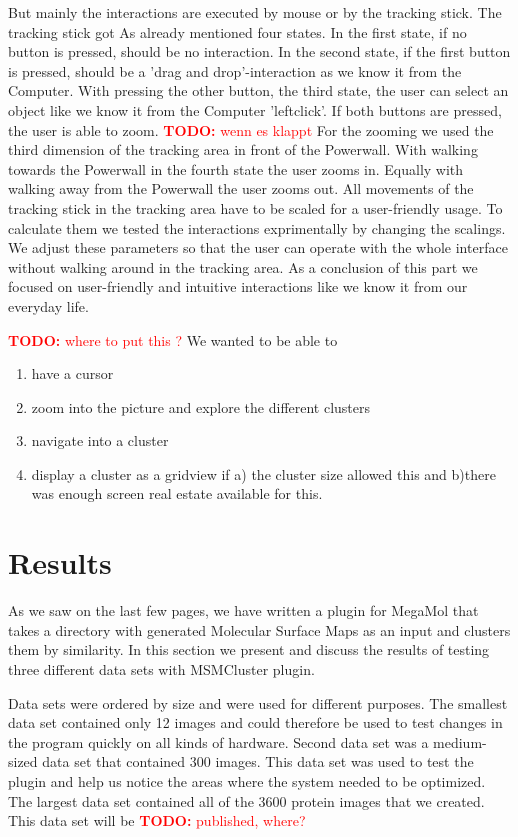 \documentclass[journal]{vgtc}       %
\newcommand{\todo}[1]{\textcolor{red}{\textbf{TODO:} #1}}
\begin{document}
But mainly the interactions are executed by mouse or by the tracking stick. The tracking stick got As already mentioned four states. In the first state, if no button is pressed, should be no interaction. In the second state, if the first button is pressed, should be a 'drag and drop'-interaction as we know it from the Computer. With pressing the other button, the third state, the user can select an object like we know it from the Computer 'leftclick'. If both buttons are pressed, the user is able to zoom. \todo{wenn es klappt} For the zooming we used the third dimension of the tracking area in front of the Powerwall. With walking towards the Powerwall in the fourth state the user zooms in. Equally with walking away from the Powerwall the user zooms out. 
All movements of the tracking stick in the tracking area have to be scaled for a user-friendly usage. To calculate them we tested the interactions exprimentally by changing the scalings. We adjust these parameters so that the user can operate with the whole interface without walking around in the tracking area.
As a conclusion of this part we focused on user-friendly and intuitive interactions like we know it from our everyday life.


\todo{where to put this ?}
We wanted to be able to 
\begin{enumerate}
  \item have a cursor 
  \item zoom into the picture and  explore the different clusters
  \item navigate into a cluster
  \item display a cluster as a gridview if a) the cluster size allowed this and b)there was enough screen real estate available for this.
  
\end{enumerate}


\section{Results}
As we saw on the last few pages, we have written a plugin for MegaMol that takes a directory with generated Molecular Surface Maps as an input and clusters  them by similarity. In this section we present and discuss the results of testing three different data sets with MSMCluster plugin. 

Data sets were ordered by size and were used for different purposes. The smallest data set contained only 12 images and could therefore be used to test changes in the program quickly on all kinds of hardware. Second data set was a medium-sized data set that contained 300 images. This data set was used to test the plugin and help us notice the areas where the system needed to be optimized. The largest data set contained all of the 3600 protein images that we created. This data set will be \todo{published, where?}
\end{document}
